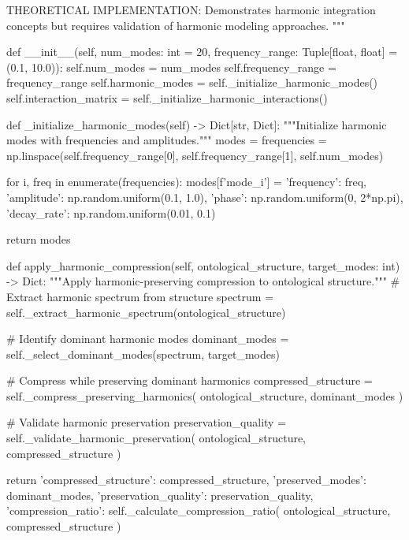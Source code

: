     THEORETICAL IMPLEMENTATION: Demonstrates harmonic integration concepts
    but requires validation of harmonic modeling approaches.
    """
    
    def __init__(self, num_modes: int = 20, frequency_range: Tuple[float, float] = (0.1, 10.0)):
        self.num_modes = num_modes
        self.frequency_range = frequency_range
        self.harmonic_modes = self._initialize_harmonic_modes()
        self.interaction_matrix = self._initialize_harmonic_interactions()
        
    def _initialize_harmonic_modes(self) -> Dict[str, Dict]:
        """Initialize harmonic modes with frequencies and amplitudes."""
        modes = {}
        frequencies = np.linspace(self.frequency_range[0], self.frequency_range[1], self.num_modes)
        
        for i, freq in enumerate(frequencies):
            modes[f'mode_{i}'] = {
                'frequency': freq,
                'amplitude': np.random.uniform(0.1, 1.0),
                'phase': np.random.uniform(0, 2*np.pi),
                'decay_rate': np.random.uniform(0.01, 0.1)
            }
            
        return modes
        
    def apply_harmonic_compression(self, ontological_structure, target_modes: int) -> Dict:
        """Apply harmonic-preserving compression to ontological structure."""
        \# Extract harmonic spectrum from structure
        spectrum = self._extract_harmonic_spectrum(ontological_structure)
        
        \# Identify dominant harmonic modes
        dominant_modes = self._select_dominant_modes(spectrum, target_modes)
        
        \# Compress while preserving dominant harmonics
        compressed_structure = self._compress_preserving_harmonics(
            ontological_structure, dominant_modes
        )
        
        \# Validate harmonic preservation
        preservation_quality = self._validate_harmonic_preservation(
            ontological_structure, compressed_structure
        )
        
        return {
            'compressed_structure': compressed_structure,
            'preserved_modes': dominant_modes,
            'preservation_quality': preservation_quality,
            'compression_ratio': self._calculate_compression_ratio(
                ontological_structure, compressed_structure
            )
        }
        
